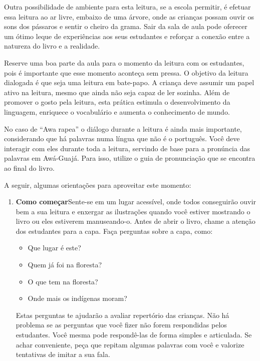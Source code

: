 \documentclass[11pt]{extarticle}
\begin{document}
{{Outra possibilidade de ambiente para esta leitura, se a escola permitir, 
é efetuar essa leitura ao ar livre, embaixo de uma árvore, onde as crianças 
possam ouvir os sons dos pássaros e sentir o cheiro da grama. Sair da sala 
de aula pode oferecer um ótimo leque de experiências aos seus estudantes e 
reforçar a conexão entre a natureza do livro e a realidade.  

Reserve uma boa parte da aula para o momento da leitura com os estudantes, 
pois é importante que esse momento aconteça sem pressa. O objetivo da 
leitura dialogada é que seja uma leitura em bate-papo. A criança deve 
assumir um papel ativo na leitura, mesmo que ainda não seja capaz de 
ler sozinha. Além de promover o gosto pela leitura, esta prática estimula 
o desenvolvimento da linguagem, enriquece o vocabulário e 
aumenta o conhecimento de mundo.

No caso de ``Awa rapea'' o diálogo durante a leitura é 
ainda mais importante, considerando que há palavras numa língua que não é o português. 
Você deve interagir com eles durante toda a 
leitura, servindo de base para a pronúncia das palavras em Awá-Guajá.
Para isso, utilize o guia de pronunciação que se encontra ao final do livro.

A seguir, algumas orientações para aproveitar este momento: 

\begin{enumerate}
\item \textbf{Como começar}\quad Sente-se em um lugar acessível, 
onde todos conseguirão ouvir bem a sua leitura e enxergar as ilustrações 
quando você estiver mostrando o livro ou eles estiverem manuseando-o. 
Antes de abrir o livro, chame a atenção dos estudantes para a capa. 
Faça perguntas sobre a capa, como: 

\begin{itemize}
\item Que lugar é este?
\item Quem já foi na floresta?
\item O que tem na floresta?
\item Onde mais os indígenas moram?
\end{itemize}

Estas perguntas te ajudarão a avaliar repertório das crianças. 
Não há problema se as perguntas que você fizer não forem respondidas pelos 
estudantes. Você mesma pode respondê-las de forma simples e articulada. Se achar 
conveniente, peça que repitam algumas palavras com você e valorize tentativas 
de imitar a sua fala. 
 

\end{enumerate}}}
\end{document}
